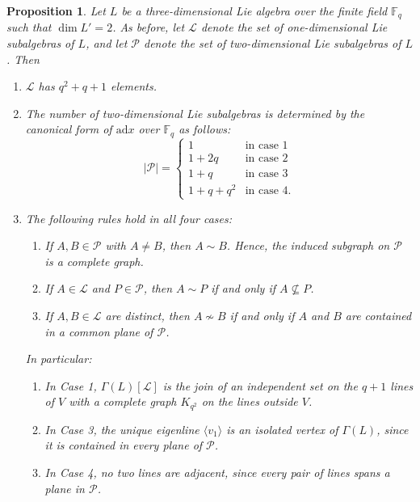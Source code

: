 \documentclass[11pt]{amsart}
\theoremstyle{plain}
\newtheorem{proposition}[theorem]{Proposition}
\def\F{\mathbb{F}}
\def\ad{\mathrm{ad}}
\begin{document}
\begin{proposition}\cite[Proposition 4.7]{TZG}\label{dim3-derived2}
Let $L$ be a three-dimensional Lie algebra over the finite field $\F_q$ such that $\dim L' = 2$. As before, let $\mathcal{L}$ denote the set of one-dimensional Lie subalgebras of $L$, and let $\mathcal{P}$ denote the set of two-dimensional Lie subalgebras of $L$. Then 
\begin{enumerate}
\item $\mathcal{L}$ has $q^2 + q + 1$ elements.
\item The number of two-dimensional Lie subalgebras is determined by the canonical form of $\ad x$ over $\F_q$ as follows:
\[|\mathcal{P}| = \begin{cases}
    1 &  \text{in case 1}\\
    1+2q &  \text{in case 2}\\
    1+q &  \text{in case 3}\\
    1+q+q^2 &  \text{in case 4}.
\end{cases}\]

\item The following rules hold in all four cases:
\begin{enumerate}
    \item If $A, B\in \mathcal{P}$ with $A\neq B$, then $A\sim B$. Hence, the induced subgraph on $\mathcal{P}$ is a complete graph.
    \item If $A \in \mathcal{L}$ and $P \in \mathcal{P}$, then $A \sim P$ if and only if $A \not\subseteq P$.
    \item If $A, B \in \mathcal{L}$ are distinct, then $A \not\sim B$ if and only if $A$ and $B$ are contained in a common plane of $\mathcal{P}$.
\end{enumerate}
    In particular:
\begin{enumerate}
    \item[(i)] In Case 1, $\Gamma(L)[\mathcal{L}]$ is the join of an independent 
    set on the $q+1$ lines of $V$ with a complete graph $K_{q^2}$ on the 
    lines outside $V$.
    \item[(ii)] In Case 3, the unique eigenline $\langle v_1\rangle$ is an isolated vertex of $\Gamma(L)$, since it is contained in every plane of $\mathcal{P}$.
    \item[(iii)] In Case 4, no two lines are adjacent, since every pair of lines 
    spans a plane in $\mathcal{P}$.
\end{enumerate}
\end{enumerate}
\end{proposition}
\end{document}
